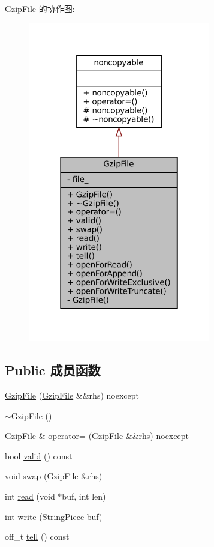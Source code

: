 Gzip\+File 的协作图\+:
\nopagebreak
\begin{figure}[H]
\begin{center}
\leavevmode
\includegraphics[width=226pt]{classmuduo_1_1GzipFile__coll__graph}
\end{center}
\end{figure}
\subsection*{Public 成员函数}
\begin{DoxyCompactItemize}
\item 
\hyperlink{classmuduo_1_1GzipFile_a4591ce59f7007cd95c859dc28622bdb4}{Gzip\+File} (\hyperlink{classmuduo_1_1GzipFile}{Gzip\+File} \&\&rhs) noexcept
\item 
\hyperlink{classmuduo_1_1GzipFile_a7d63cf49097d53ffc7e8d945a6816a2a}{$\sim$\+Gzip\+File} ()
\item 
\hyperlink{classmuduo_1_1GzipFile}{Gzip\+File} \& \hyperlink{classmuduo_1_1GzipFile_a8dddcc232bc559a7ced99ef5f05689b4}{operator=} (\hyperlink{classmuduo_1_1GzipFile}{Gzip\+File} \&\&rhs) noexcept
\item 
bool \hyperlink{classmuduo_1_1GzipFile_a315419f26d3c59fa143b49b90a019049}{valid} () const
\item 
void \hyperlink{classmuduo_1_1GzipFile_a545d0ac9e0b6d92ec76093784b550cb2}{swap} (\hyperlink{classmuduo_1_1GzipFile}{Gzip\+File} \&rhs)
\item 
int \hyperlink{classmuduo_1_1GzipFile_a3246bad9b6760a10a502669da1264746}{read} (void $\ast$buf, int len)
\item 
int \hyperlink{classmuduo_1_1GzipFile_a9df1dd3bba47672243cc91713d8a59dd}{write} (\hyperlink{classmuduo_1_1StringPiece}{String\+Piece} buf)
\item 
off\+\_\+t \hyperlink{classmuduo_1_1GzipFile_a6e8ce06f95605b89cfcee42fc3e5162c}{tell} () const
\end{DoxyCompactItemize}
